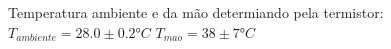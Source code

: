 
Temperatura ambiente e da mão determiando pela termistor:
$T_{ambiente} = 28.0 \pm 0.2 °C$
$T_{mao} = 38 \pm 7 °C$
